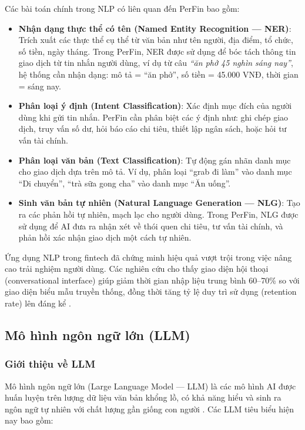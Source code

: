 Các bài toán chính trong NLP có liên quan đến PerFin bao gồm:

\begin{itemize}
    \item \textbf{Nhận dạng thực thể có tên (Named Entity Recognition --- NER)}: Trích xuất các thực thể cụ thể từ văn bản như tên người, địa điểm, tổ chức, số tiền, ngày tháng. Trong PerFin, NER được sử dụng để bóc tách thông tin giao dịch từ tin nhắn người dùng, ví dụ từ câu \textit{``ăn phở 45 nghìn sáng nay''}, hệ thống cần nhận dạng: mô tả = ``ăn phở'', số tiền = 45.000 VNĐ, thời gian = sáng nay.

    \item \textbf{Phân loại ý định (Intent Classification)}: Xác định mục đích của người dùng khi gửi tin nhắn. PerFin cần phân biệt các ý định như: ghi chép giao dịch, truy vấn số dư, hỏi báo cáo chi tiêu, thiết lập ngân sách, hoặc hỏi tư vấn tài chính.

    \item \textbf{Phân loại văn bản (Text Classification)}: Tự động gán nhãn danh mục cho giao dịch dựa trên mô tả. Ví dụ, phân loại ``grab đi làm'' vào danh mục ``Di chuyển'', ``trà sữa gong cha'' vào danh mục ``Ăn uống''.

    \item \textbf{Sinh văn bản tự nhiên (Natural Language Generation --- NLG)}: Tạo ra các phản hồi tự nhiên, mạch lạc cho người dùng. Trong PerFin, NLG được sử dụng để AI đưa ra nhận xét về thói quen chi tiêu, tư vấn tài chính, và phản hồi xác nhận giao dịch một cách tự nhiên.
\end{itemize}

Ứng dụng NLP trong fintech đã chứng minh hiệu quả vượt trội trong việc nâng cao trải nghiệm người dùng. Các nghiên cứu cho thấy giao diện hội thoại (conversational interface) giúp giảm thời gian nhập liệu trung bình 60--70\% so với giao diện biểu mẫu truyền thống, đồng thời tăng tỷ lệ duy trì sử dụng (retention rate) lên đáng kể \cite{ref9}.

\subsection{Mô hình ngôn ngữ lớn (LLM)}
\label{subsec:llm}

\subsubsection{Giới thiệu về LLM}

Mô hình ngôn ngữ lớn (Large Language Model --- LLM) là các mô hình AI được huấn luyện trên lượng dữ liệu văn bản khổng lồ, có khả năng hiểu và sinh ra ngôn ngữ tự nhiên với chất lượng gần giống con người \cite{ref10}. Các LLM tiêu biểu hiện nay bao gồm:

